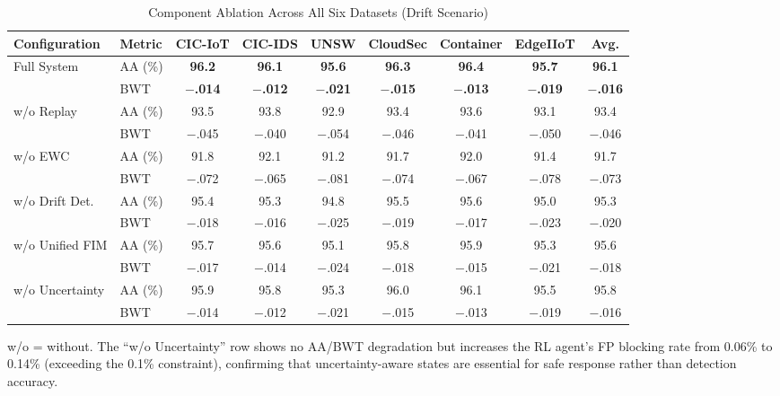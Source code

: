 \documentclass[journal]{IEEEtran}
\theoremstyle{definition}
\theoremstyle{remark}
\begin{document}
\begin{table}[!t]
\centering
\caption{Component Ablation Across All Six Datasets (Drift Scenario)}
\label{tab:ablation}
\begin{threeparttable}
\begin{tabular}{@{}llccccccc@{}}
\toprule
\textbf{Configuration} & \textbf{Metric} & \textbf{CIC-IoT} & \textbf{CIC-IDS} & \textbf{UNSW} & \textbf{CloudSec} & \textbf{Container} & \textbf{EdgeIIoT} & \textbf{Avg.} \\
\midrule
\multirow{2}{*}{Full System} & AA (\%) & \textbf{96.2} & \textbf{96.1} & \textbf{95.6} & \textbf{96.3} & \textbf{96.4} & \textbf{95.7} & \textbf{96.1} \\
 & BWT & \textbf{$-$.014} & \textbf{$-$.012} & \textbf{$-$.021} & \textbf{$-$.015} & \textbf{$-$.013} & \textbf{$-$.019} & \textbf{$-$.016} \\
\midrule
\multirow{2}{*}{w/o Replay} & AA (\%) & 93.5 & 93.8 & 92.9 & 93.4 & 93.6 & 93.1 & 93.4 \\
 & BWT & $-$.045 & $-$.040 & $-$.054 & $-$.046 & $-$.041 & $-$.050 & $-$.046 \\
\midrule
\multirow{2}{*}{w/o EWC} & AA (\%) & 91.8 & 92.1 & 91.2 & 91.7 & 92.0 & 91.4 & 91.7 \\
 & BWT & $-$.072 & $-$.065 & $-$.081 & $-$.074 & $-$.067 & $-$.078 & $-$.073 \\
\midrule
\multirow{2}{*}{w/o Drift Det.} & AA (\%) & 95.4 & 95.3 & 94.8 & 95.5 & 95.6 & 95.0 & 95.3 \\
 & BWT & $-$.018 & $-$.016 & $-$.025 & $-$.019 & $-$.017 & $-$.023 & $-$.020 \\
\midrule
\multirow{2}{*}{w/o Unified FIM} & AA (\%) & 95.7 & 95.6 & 95.1 & 95.8 & 95.9 & 95.3 & 95.6 \\
 & BWT & $-$.017 & $-$.014 & $-$.024 & $-$.018 & $-$.015 & $-$.021 & $-$.018 \\
\midrule
\multirow{2}{*}{w/o Uncertainty} & AA (\%) & 95.9 & 95.8 & 95.3 & 96.0 & 96.1 & 95.5 & 95.8 \\
 & BWT & $-$.014 & $-$.012 & $-$.021 & $-$.015 & $-$.013 & $-$.019 & $-$.016 \\
\bottomrule
\end{tabular}
\begin{tablenotes}
\small
\item[] w/o = without. The ``w/o Uncertainty'' row shows no AA/BWT degradation but increases the RL agent's FP blocking rate from 0.06\% to 0.14\% (exceeding the 0.1\% constraint), confirming that uncertainty-aware states are essential for safe response rather than detection accuracy.
\end{tablenotes}
\end{threeparttable}
\end{table}
\end{document}
